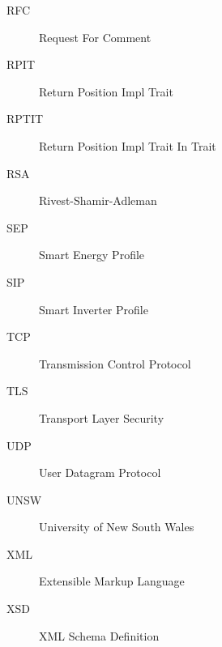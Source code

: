 \begin{description}
\item[RFC] Request For Comment
\item[RPIT] Return Position Impl Trait
\item[RPTIT] Return Position Impl Trait In Trait
\item[RSA] Rivest-Shamir-Adleman
\item[SEP] Smart Energy Profile
\item[SIP] Smart Inverter Profile
\item[TCP] Transmission Control Protocol
\item[TLS] Transport Layer Security
\item[UDP] User Datagram Protocol
\item[UNSW] University of New South Wales
\item[XML] Extensible Markup Language
\item[XSD] XML Schema Definition
\end{description}